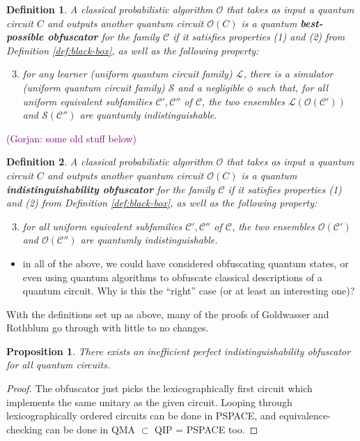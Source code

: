 \documentclass[11pt]{article}
\numberwithin{equation}{section}
\newtheorem{proposition}{Proposition}
\newtheorem{definition}{Definition}
\newcommand{\ga}[1]{{ \textcolor{purple}{(Gorjan:  #1)}}{}}
\begin{document}
\begin{definition} A classical probabilistic algorithm $\mathcal O$ that takes as input a quantum circuit $C$ and outputs another quantum circuit $\mathcal O(C)$ is a quantum {\bf best-possible obfuscator} for the family $\mathcal C$ if it satisfies properties (1) and (2) from Definition \ref{def:black-box}, as well as the following property:
\begin{enumerate}
\setcounter{enumi}{2}
\item for any learner (uniform quantum circuit family) $\mathcal L$, there is a simulator (uniform quantum circuit family) $\mathcal S$ and a negligible $\phi$ such that, for all uniform equivalent subfamilies $\mathcal C', \mathcal C''$ of $\mathcal C$, the two ensembles $\mathcal L(\mathcal O(\mathcal C'))$ and $\mathcal S(\mathcal C'')$ are quantumly indistinguishable.
\end{enumerate}
\end{definition}


\ga{some old stuff below}

\begin{definition} A classical probabilistic algorithm $\mathcal O$ that takes as input a quantum circuit $C$ and outputs another quantum circuit $\mathcal O(C)$ is a quantum {\bf indistinguishability obfuscator} for the family $\mathcal C$ if it satisfies properties (1) and (2) from Definition \ref{def:black-box}, as well as the following property:
\begin{enumerate}
\setcounter{enumi}{2}
\item for all uniform equivalent subfamilies $\mathcal C', \mathcal C''$ of $\mathcal C$, the two ensembles $\mathcal O(\mathcal C')$ and $\mathcal O(\mathcal C'')$ are quantumly indistinguishable.
\end{enumerate}
\end{definition}

\begin{itemize}
\item in all of the above, we could have considered obfuscating quantum states, or even using quantum algorithms to obfuscate classical descriptions of a quantum circuit. Why is this the ``right'' case (or at least an interesting one)?
\end{itemize}

With the definitions set up as above, many of the proofs of Goldwasser and Rothblum go through with little to no changes.

\begin{proposition} There exists an inefficient perfect indistinguishability obfuscator for all quantum circuits.
\end{proposition}
\begin{proof}
The obfuscator just picks the lexicographically first circuit which implements the same unitary as the given circuit. Looping through lexicographically ordered circuits can be done in PSPACE, and equivalence-checking can be done in QMA $\subset$ QIP = PSPACE too.
\end{proof}
\end{document}
